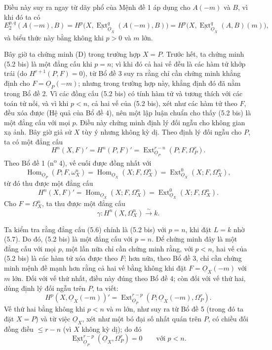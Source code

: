 \documentclass[11pt,twoside,openany]{book}
\numberwithin{equation}{section}
\newcommand{\src}[1]{%
  \phantomsection\hypertarget{src:\fgasourceid:#1}{}%
  \marginpar{\raggedleft\footnotesize\sffamily #1}%
}
\newcommand{\fgasourceid}{unset}
\newcommand{\Osh}{\underline{O}}
\newcommand{\Extsh}{\underline{\operatorname{Ext}}}
\begin{document}
Điều này suy ra ngay từ dãy phổ của Mệnh đề 1 áp dụng cho
$A(-m)$ và $B$, vì khi đó ta có
\[
  E_{2}^{p,q}(A(-m),B)
  =H^{p}\bigl(X,\Extsh_{\Osh_X}^{q}(A(-m),B)\bigr)
  =H^{p}\bigl(X,\Extsh_{\Osh_X}^{q}(A,B)(m)\bigr),
\]
và biểu thức này bằng không khi $p>0$ và $m$ lớn.

Bây giờ ta chứng minh (D) trong trường hợp $X=P$. Trước hết, ta chứng minh (5.2 bis)
là một đẳng cấu khi $p=n$; vì khi đó cả hai vế đều là các
hàm tử khớp trái (do $H^{r+1}(P,F)=0$), từ Bổ đề 3 suy ra rằng
chỉ cần chứng minh khẳng định cho $F=\Osh_P(-m)$; nhưng trong trường hợp này, khẳng định đó
đã nằm trong Bổ đề 2. Vì các đồng cấu (5.2 bis) có tính hàm tử và
tương thích với các toán tử nối, và vì khi $p<n$, cả hai vế của
(5.2 bis), xét như các hàm tử theo $F$, đều xóa được (Hệ quả của Bổ đề 4), nên
một lập luận chuẩn cho thấy (5.2 bis) là một đẳng cấu
với mọi $p$. Điều này chứng minh định lý đối ngẫu cho không gian xạ ảnh.
Bây giờ giả sử $X$ tùy ý nhưng không kỳ dị. Theo định lý
đối ngẫu cho $P$, ta có một đẳng cấu
\[
  H^{n}(X,F)'=H^{n}(P,F)'
  =\operatorname{Ext}_{\Osh_P}^{r-n}(P;F,\Omega_P^{r}).
\]
Theo Bổ đề 1 (n\textsuperscript{o} 4), vế cuối được đồng nhất với
\[
  \operatorname{Hom}_{\Osh_P}(P;F,\omega_X^{n})
  =\operatorname{Hom}_{\Osh_X}(X;F,\Omega_X^{n})
  =\operatorname{Ext}_{\Osh_X}^{0}(X;F,\Omega_X^{n}),
\]
từ đó thu được một đẳng cấu
\begin{equation}\tag{5.6}
  H^{n}(X,F)'=\operatorname{Hom}_{\Osh_X}(X;F,\Omega_X^{n})
  =\operatorname{Ext}_{\Osh_X}^{0}(X;F,\Omega_X^{n}).
\end{equation}
Cho $F=\Omega_X^{n}$, ta thu được một đẳng cấu
\begin{equation}\tag{5.7}
  \gamma:H^{n}(X,\Omega_X^{n})\xrightarrow{\sim}k.
\end{equation}

\src{185}
Ta kiểm tra rằng đẳng cấu (5.6) chính là (5.2 bis) với $p=n$, khi
đặt $L=k$ nhờ (5.7). Do đó, (5.2 bis) là một đẳng cấu với
$p=n$. Để chứng minh đây là một đẳng cấu với mọi $p$, một lần nữa chỉ cần
chứng minh rằng, với $p<n$, hai vế của (5.2 bis) là các hàm tử
xóa được theo $F$; hơn nữa, theo Bổ đề 3, chỉ cần chứng minh mệnh đề mạnh hơn
rằng cả hai vế bằng không khi đặt $F=\Osh_X(-m)$ với $m$ lớn. Đối với vế
thứ nhất, điều này đúng theo Bổ đề 4; còn đối với vế thứ hai, dùng
định lý đối ngẫu trên $P$, ta viết:
\[
  H^{p}(X,\Osh_X(-m))'
  =\operatorname{Ext}_{\Osh_P}^{r-p}
    (P;\Osh_X(-m),\Omega_P^{r}).
\]
Vế thứ hai bằng không khi $p<n$ và $m$ lớn, như suy ra từ Bổ đề 5
(trong đó ta đặt $X=P$) và từ việc $\Osh_X$, xét như một bó đại số
nhất quán trên $P$, có chiều đối đồng điều $\leq r-n$ (vì $X$ không
kỳ dị); do đó
\[
  \Extsh_{\Osh_P}^{r-p}(\Osh_X,\Omega_P^{r})=0
  \qquad\text{với }p<n.
\]
\end{document}
